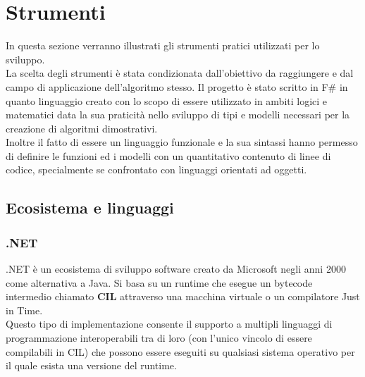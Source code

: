 \documentclass[\main/tesi.tex]{subfiles}
\begin{document}
\chapter{Strumenti}

In questa sezione verranno illustrati gli strumenti pratici utilizzati per lo sviluppo. \\
La scelta degli strumenti è stata condizionata dall'obiettivo da raggiungere e dal campo di applicazione dell'algoritmo stesso.
Il progetto è stato scritto in F\# \cite{fsharp} in quanto linguaggio creato con lo scopo di essere utilizzato in ambiti logici e matematici data la sua praticità nello sviluppo di tipi e modelli necessari per la creazione di algoritmi dimostrativi. \\
Inoltre il fatto di essere un linguaggio funzionale e la sua sintassi hanno permesso di definire le funzioni ed i modelli con un quantitativo contenuto di linee di codice, specialmente se confrontato con linguaggi orientati ad oggetti. \\

\section{Ecosistema e linguaggi}
\subsection{.NET}
.NET è un ecosistema di sviluppo software creato da Microsoft negli anni 2000 come alternativa a Java. Si basa su un runtime che esegue un bytecode intermedio chiamato \textbf{CIL} \cite{cil} attraverso una macchina virtuale o un compilatore Just in Time.\\
Questo tipo di implementazione consente il supporto a multipli linguaggi di programmazione interoperabili tra di loro (con l'unico vincolo di essere compilabili in CIL) che possono essere eseguiti su qualsiasi sistema operativo per il quale esista una versione del runtime.
\end{document}
